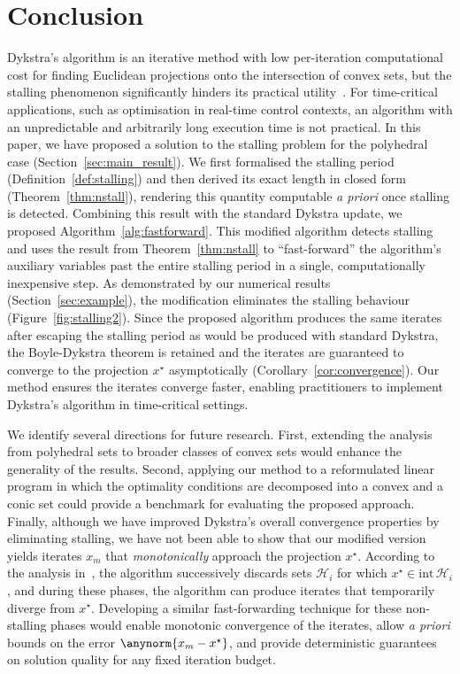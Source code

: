 \section{Conclusion}
\label{sec:conclusion}

Dykstra's algorithm is an iterative method with low per-iteration computational cost for finding Euclidean projections onto the intersection of convex sets, but the stalling phenomenon significantly hinders its practical utility~\cite{BAUSCHKESWISS}. For time-critical applications, such as optimisation in real-time control contexts, an algorithm with an unpredictable and arbitrarily long execution time is not practical. In this paper, we have proposed a solution to the stalling problem for the polyhedral case (Section~\ref{sec:main_result}). We first formalised the stalling period (Definition~\ref{def:stalling}) and then derived its exact length in closed form (Theorem~\ref{thm:nstall}), rendering this quantity computable \textit{a priori} once stalling is detected. Combining this result with the standard Dykstra update, we proposed Algorithm~\ref{alg:fastforward}. This modified algorithm detects stalling and uses the result from Theorem~\ref{thm:nstall} to ``fast-forward'' the algorithm's auxiliary variables past the entire stalling period in a single, computationally inexpensive step. As demonstrated by our numerical results (Section~\ref{sec:example}), the modification eliminates the stalling behaviour (Figure~\ref{fig:stalling2}). Since the proposed algorithm produces the same iterates after escaping the stalling period as would be produced with standard Dykstra, the Boyle-Dykstra theorem is retained and the iterates are guaranteed to converge to the projection $x^\star$ asymptotically (Corollary~\ref{cor:convergence}).
Our method ensures the iterates converge faster, enabling practitioners to implement Dykstra's algorithm in time-critical settings.

We identify several directions for future research. First, extending the analysis from polyhedral sets to broader classes of convex sets would enhance the generality of the results. Second, applying our method to a reformulated linear program in which the optimality conditions are decomposed into a convex and a conic set could provide a benchmark for evaluating the proposed approach. Finally, although we have improved Dykstra's overall convergence properties by eliminating stalling, we have not been able to show that our modified version yields iterates $x_m$ that \emph{monotonically} approach the projection $x^\star$. According to the analysis in~\cite{DYKSTRAPOLY}, the algorithm successively discards sets $\mathcal{H}_i$ for which $x^\star\in\text{int}\,\mathcal{H}_i$, and during these phases, the algorithm can produce iterates that temporarily diverge from $x^\star$. Developing a similar fast-forwarding technique for these non-stalling phases would enable monotonic convergence of the iterates, allow \textit{a priori} bounds on the error $\anynorm{x_m-x^\star}$, and provide deterministic guarantees on solution quality for any fixed iteration budget.


